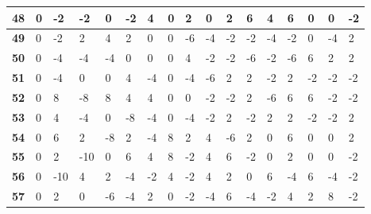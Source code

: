 \begin{longtable}[c]{|l|l|l|l|l|l|l|l|l|l|l|l|l|l|l|l|l|}
\textbf{48} & 0          & -2         & -2         & 0          & -2         & 4          & 0          & 2          & 0          & 2          & 6           & 4           & 6           & 0           & 0           & -2           \\ \hline
\textbf{49} & 0          & -2         & 2          & 4          & 2          & 0          & 0          & -6         & -4         & -2         & -2          & -4          & -2          & 0           & -4          & 2            \\ \hline
\textbf{50} & 0          & -4         & -4         & -4         & 0          & 0          & 0          & 4          & -2         & -2         & -6          & -2          & -6          & 6           & 2           & 2            \\ \hline
\textbf{51} & 0          & -4         & 0          & 0          & 4          & -4         & 0          & -4         & -6         & 2          & 2           & -2          & 2           & -2          & -2          & -2           \\ \hline
\textbf{52} & 0          & 8          & -8         & 8          & 4          & 4          & 0          & 0          & -2         & -2         & 2           & -6          & 6           & 6           & -2          & -2           \\ \hline
\textbf{53} & 0          & 4          & -4         & 0          & -8         & -4         & 0          & -4         & -2         & 2          & -2          & 2           & 2           & -2          & -2          & 2            \\ \hline
\textbf{54} & 0          & 6          & 2          & -8         & 2          & -4         & 8          & 2          & 4          & -6         & 2           & 0           & 6           & 0           & 0           & 2            \\ \hline
\textbf{55} & 0          & 2          & -10        & 0          & 6          & 4          & 8          & -2         & 4          & 6          & -2          & 0           & 2           & 0           & 0           & -2           \\ \hline
\textbf{56} & 0          & -10        & 4          & 2          & -4         & -2         & 4          & -2         & 4          & 2          & 0           & 6           & -4          & 6           & -4          & -2           \\ \hline
\textbf{57} & 0          & 2          & 0          & -6         & -4         & 2          & 0          & -2         & -4         & 6          & -4          & -2          & 4           & 2           & 8           & -2           \\ \hline

\end{longtable}
